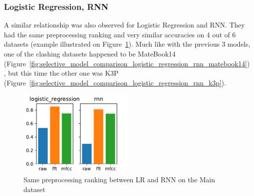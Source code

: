 \documentclass[../main.tex]{subfiles}
\begin{document}
\subsubsection{Logistic Regression, RNN}
A similar relationship was also observed for Logistic Regression and RNN. They
had the same preprocessing ranking and very similar accuracies on 4 out of 6
datasets (example illustrated on Figure~\ref{fig:selective_model_comparison_logistic_regression_rnn_main}).
Much like with the previous 3 models, one of the clashing datasets happened to be
MateBook14 (Figure~\ref{fig:selective_model_comparison_logistic_regression_rnn_matebook14}),
but this time the other one was
K3P (Figure~\ref{fig:selective_model_comparison_logistic_regression_rnn_k3p}).
\begin{figure}
    \centering
    \includegraphics[width=0.5\textwidth]{figures/plots/model_comparison/custom_logistic_regression_rnn_main.pdf}
    \caption{Same preprocessing ranking between LR and RNN on the Main dataset}
    \label{fig:selective_model_comparison_logistic_regression_rnn_main}
\end{figure}
\end{document}
